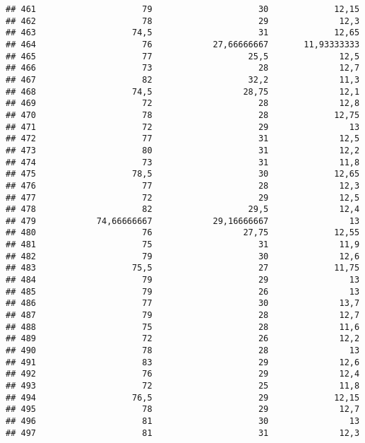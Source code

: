 \documentclass[
]{article}
\begin{document}
\begin{verbatim}
## 461                     79                     30             12,15
## 462                     78                     29              12,3
## 463                   74,5                     31             12,65
## 464                     76            27,66666667       11,93333333
## 465                     77                   25,5              12,5
## 466                     73                     28              12,7
## 467                     82                   32,2              11,3
## 468                   74,5                  28,75              12,1
## 469                     72                     28              12,8
## 470                     78                     28             12,75
## 471                     72                     29                13
## 472                     77                     31              12,5
## 473                     80                     31              12,2
## 474                     73                     31              11,8
## 475                   78,5                     30             12,65
## 476                     77                     28              12,3
## 477                     72                     29              12,5
## 478                     82                   29,5              12,4
## 479            74,66666667            29,16666667                13
## 480                     76                  27,75             12,55
## 481                     75                     31              11,9
## 482                     79                     30              12,6
## 483                   75,5                     27             11,75
## 484                     79                     29                13
## 485                     79                     26                13
## 486                     77                     30              13,7
## 487                     79                     28              12,7
## 488                     75                     28              11,6
## 489                     72                     26              12,2
## 490                     78                     28                13
## 491                     83                     29              12,6
## 492                     76                     29              12,4
## 493                     72                     25              11,8
## 494                   76,5                     29             12,15
## 495                     78                     29              12,7
## 496                     81                     30                13
## 497                     81                     31              12,3

\end{verbatim}
\end{document}
